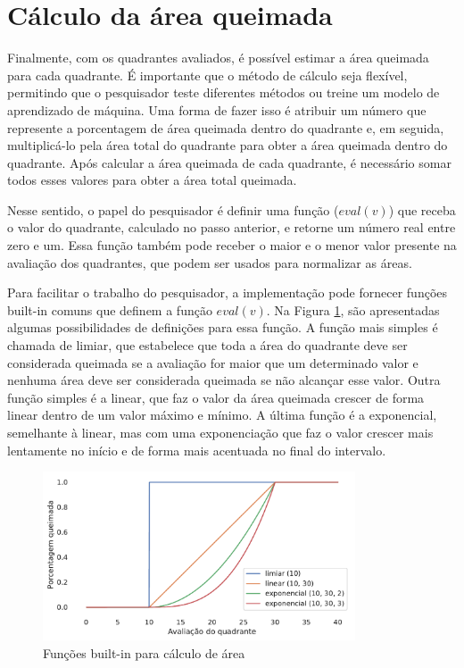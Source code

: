 \documentclass[cic,tc]{iiufrgs}
\begin{document}
\section{Cálculo da área queimada}

Finalmente, com os quadrantes avaliados, é possível estimar a área queimada para cada quadrante. É importante que o método de cálculo seja flexível, permitindo que o pesquisador teste diferentes métodos ou treine um modelo de aprendizado de máquina. Uma forma de fazer isso é atribuir um número que represente a porcentagem de área queimada dentro do quadrante e, em seguida, multiplicá-lo pela área total do quadrante para obter a área queimada dentro do quadrante. Após calcular a área queimada de cada quadrante, é necessário somar todos esses valores para obter a área total queimada. \par

Nesse sentido, o papel do pesquisador é definir uma função ($eval(v)$) que receba o valor do quadrante, calculado no passo anterior, e retorne um número real entre zero e um. Essa função também pode receber o maior e o menor valor presente na avaliação dos quadrantes, que podem ser usados para normalizar as áreas. \par

Para facilitar o trabalho do pesquisador, a implementação pode fornecer funções built-in comuns que definem a função $eval(v)$. Na Figura \ref{fig:eval_func_built_in}, são apresentadas algumas possibilidades de definições para essa função. A função mais simples é chamada de limiar, que estabelece que toda a área do quadrante deve ser considerada queimada se a avaliação for maior que um determinado valor e nenhuma área deve ser considerada queimada se não alcançar esse valor. Outra função simples é a linear, que faz o valor da área queimada crescer de forma linear dentro de um valor máximo e mínimo. A última função é a exponencial, semelhante à linear, mas com uma exponenciação que faz o valor crescer mais lentamente no início e de forma mais acentuada no final do intervalo. \par

\begin{figure}[H]
    \caption{Funções built-in para cálculo de área}
    \begin{center}
        \includegraphics[width=25em]{eval_func_built_in}
    \end{center}
    \label{fig:eval_func_built_in}
\end{figure}
\end{document}
